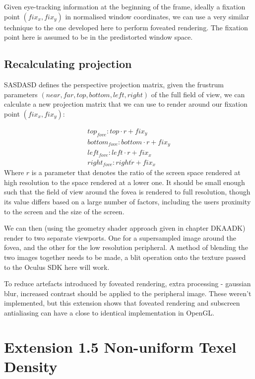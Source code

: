 \documentclass[12pt,a4paper,twoside,openright]{report}
\begin{document}
Given eye-tracking information at the beginning of the frame, ideally a fixation point $(fix_x,fix_y)$ in normalised window coordinates, we can use a very similar technique to the one developed here to perform foveated rendering. The fixation point here is assumed to be in the predistorted window space. 

\subsection{Recalculating projection}

SASDASD defines the perspective projection matrix, given the frustrum parameters $(near, far, top, bottom, left, right)$ of the full field of view, we can calculate a new projection matrix that we can use to render around our fixation point $(fix_x, fix_y)$:

\[
\begin{matrix}
top_{fove}: top \cdot r + fix_y \\
bottom_{fove}: bottom \cdot r + fix_y \\
left_{fove}: left \cdot r + fix_x \\
right_{fove}: right \dot r + fix_x 
\end{matrix}
\]
Where $r$ is a parameter that denotes the ratio of the screen space rendered at high resolution to the space rendered at a lower one. It should be small enough such that the field of view around the fovea is rendered to full resolution, though its value differs based on a large number of factors, including the users proximity to the screen and the size of the screen.

We can then (using the geometry shader approach given in chapter DKAADK) render to two separate viewports. One for a supersampled image around the fovea, and the other for the low resolution peripheral. A method of blending the two images together needs to be made, a blit operation onto the texture passed to the Oculus SDK here will work. 

To reduce artefacts introduced by foveated rendering, extra processing - gaussian blur, increased contrast should be applied to the peripheral image. These weren't implemented, but this extension shows that foveated rendering and subscreen antialiasing can have a close to identical implementation in OpenGL.

\section{Extension 1.5 Non-uniform Texel Density}
\end{document}
